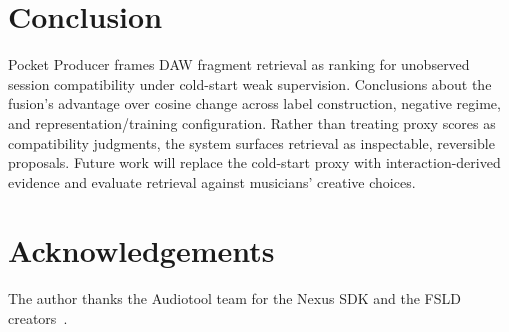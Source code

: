 \documentclass{article}
\begin{document}
\section{Conclusion}\label{sec:conclusion}

Pocket Producer frames DAW fragment retrieval as ranking for
unobserved session compatibility under cold-start weak
supervision.  Conclusions about the fusion's advantage over
cosine change across label construction, negative regime, and
representation/training configuration.  Rather than treating proxy scores
as compatibility judgments, the system surfaces retrieval as
inspectable, reversible proposals.
Future work will replace the cold-start proxy with
interaction-derived evidence and evaluate retrieval against
musicians' creative choices.


\newpage

\section{Acknowledgements}

The author thanks the Audiotool team for the Nexus SDK and the FSLD
creators~\cite{ramires2020fsld}.


\end{document}

